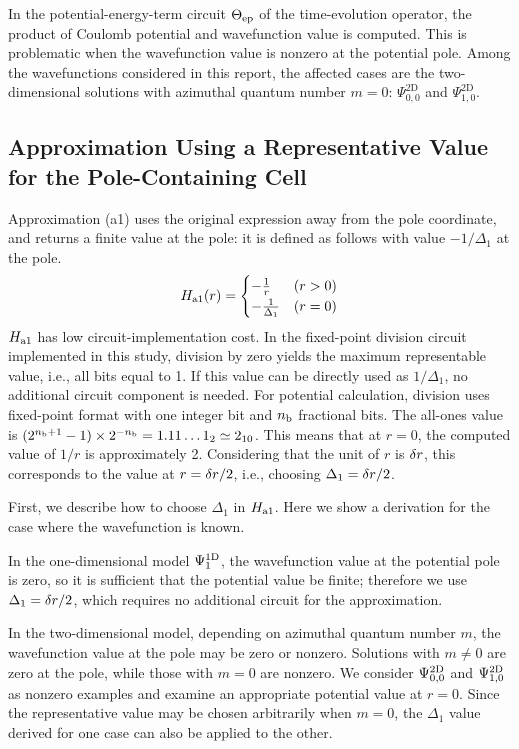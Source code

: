 \documentclass[a4paper,11pt]{article}
\begin{document}
In the potential-energy-term circuit $\Theta_{\mathrm{ep}}$ of the time-evolution operator,
the product of Coulomb potential and wavefunction value is computed. This is
problematic when the wavefunction value is nonzero at the potential pole.
Among the wavefunctions considered in this report, the affected cases are the
two-dimensional solutions with azimuthal quantum number $m=0$:
$\Psi_{0,0}^{\mathrm{2D}}$ and $\Psi_{1,0}^{\mathrm{2D}}$.

\subsection{Approximation Using a Representative Value for the Pole-Containing Cell}
Approximation (a1) uses the original expression away from the pole coordinate,
and returns a finite value at the pole:
it is defined as follows with value $-1/\Delta_1$ at the pole.
\begin{equation}
H_{\mathrm{a1}}(r) = \begin{cases}
-\frac{1}{r} & (r>0) \\
-\frac{1}{\Delta_1} & (r=0)
\end{cases}\label{eq:Ha1r}
\end{equation}
$H_{\mathrm{a1}}$ has low circuit-implementation cost. In the fixed-point division
circuit implemented in this study, division by zero yields the maximum
representable value, i.e., all bits equal to 1. If this value can be directly
used as $1/\Delta_1$, no additional circuit component is needed. For potential
calculation, division uses fixed-point format with one integer bit and $n_{\mathrm{b}}$
fractional bits. The all-ones value is
$(2^{n_{\mathrm{b}}+1}-1)\times2^{-n_{\mathrm{b}}}=1.11\ldots1_2\simeq2_{10}$. This means that at
$r=0$, the computed value of $1/r$ is approximately 2. Considering that the
unit of $r$ is $\delta r$, this corresponds to the value at $r=\delta r/2$, i.e.,
choosing $\Delta_1=\delta r/2$.

First, we describe how to choose $\Delta_1$ in $H_{\mathrm{a1}}$. Here we show a
derivation for the case where the wavefunction is known.

In the one-dimensional model $\Psi^{\mathrm{1D}}_1$, the wavefunction value at the
potential pole is zero, so it is sufficient that the potential value be finite;
therefore we use $\Delta_1=\delta r/2$, which requires no additional circuit for
the approximation.

In the two-dimensional model, depending on azimuthal quantum number $m$, the
wavefunction value at the pole may be zero or nonzero. Solutions with $m\ne0$
are zero at the pole, while those with $m=0$ are nonzero. We consider
$\Psi^{\mathrm{2D}}_{0,0}$ and $\Psi^{\mathrm{2D}}_{1,0}$ as nonzero examples and examine an
appropriate potential value at $r=0$. Since the representative value may be
chosen arbitrarily when $m=0$, the $\Delta_1$ value derived for one case can
also be applied to the other.
\end{document}
